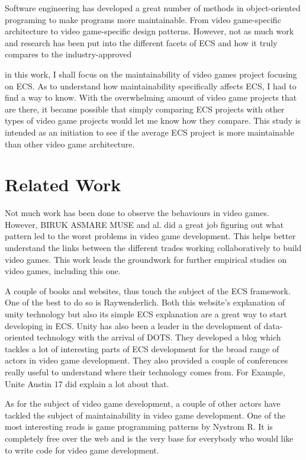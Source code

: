 \documentclass{IEEEcsmag}
\begin{document}
Software engineering has developed a great number of methods in object-oriented programing to make programs more maintainable. From video game-specific architecture to video game-specific design patterns. However, not as much work and research has been put into the different facets of ECS and how it truly compares to the industry-approved 

in this work, I shall focus on the maintainability of video games project focusing on ECS. As to understand how maintainability specifically affects ECS, I had to find a way to know. With the overwhelming amount of video game projects that are there, it became possible that simply comparing ECS projects with other types of video game projects would let me know how they compare. This study is intended as an initiation to see if the average ECS project is more maintainable than  other video game architecture.

\section{Related Work}

Not much work has been done to observe the behaviours in video games. However, BIRUK ASMARE MUSE and al. did a great job figuring out what pattern led to the worst problems in video game development. This helps better understand the links between the different trades working collaboratively to build video games. This work leads the groundwork for further empirical studies on video games, including this one. 

A couple of books and websites, thus touch the subject of the ECS framework. One of the best to do so is Raywenderlich. Both this website's explanation of unity technology but also its simple ECS explanation are a great way to start developing in ECS. Unity has also been a leader in the development of data-oriented technology with the arrival of DOTS. They developed a blog which tackles a lot of interesting parts of ECS development for the broad range of actors in video game development. They also provided a couple of conferences really useful to understand where their technology comes from. For Example, Unite Austin 17 did explain a lot about that.

As for the subject of video game development, a couple of other actors have tackled the subject of maintainability in video game development. One of the most interesting reads is game programming patterns by Nystrom R. It is completely free over the web and is the very base for everybody who would like to write code for video game development.
\end{document}
